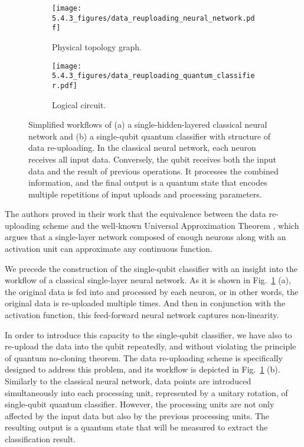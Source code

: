 \begin{figure}
	\centering
	\begin{subfigure}{0.3\textwidth}
		\centering
		\texttt{[image: 5.4.3\_figures/data\_reuploading\_neural\_network.pdf]}
		\caption{Physical topology graph.}
	\end{subfigure}
	\begin{subfigure}{0.3\textwidth}
		\centering
		\texttt{[image: 5.4.3\_figures/data\_reuploading\_quantum\_classifier.pdf]}
		\caption{Logical circuit.}
	\end{subfigure}
    \captionsetup{justification=raggedright,singlelinecheck=false}
    \caption{Simplified workflows of (a) a single-hidden-layered classical neural network and (b) a single-qubit quantum classifier with structure of data re-uploading.
    In the classical neural network, each neuron receives all input data. Conversely, the qubit receives both the input data and the result of previous operations. It processes the combined information, and the final output is a quantum state that encodes multiple repetitions of input uploads and processing parameters.}
    \label{diagram_data_reuploading}
\end{figure}

The authors proved in their work that the equivalence between the data re-uploading scheme and the well-known Universal Approximation Theorem \cite{HORNIK1991251}, which argues that a single-layer network composed of enough neurons along with an activation unit can approximate any continuous function.



We precede the construction of the single-qubit classifier with an insight into the workflow of a classical single-layer neural network.
As it is shown in Fig.~\ref{diagram_data_reuploading} (a), the original data is fed into and processed by each neuron, or in other words, the original data is re-uploaded multiple times. And then in conjunction with the activation function, this feed-forward neural network captures non-linearity.

In order to introduce this capacity to the single-qubit classifier, we have also to re-upload the data into the qubit repeatedly, and without violating the principle of quantum no-cloning theorem. The data re-uploading scheme \cite{PerezSalinas2020datareuploading} is specifically designed to address this problem, and its workflow is depicted in Fig.~\ref{diagram_data_reuploading} (b). Similarly to the classical neural network, data points are introduced simultaneously into each processing unit, represented by a unitary rotation, of single-qubit quantum classifier.
However, the processing units are not only affected by the input data but also by the previous processing units.
The resulting output is a quantum state that will be measured to extract the classification result.


